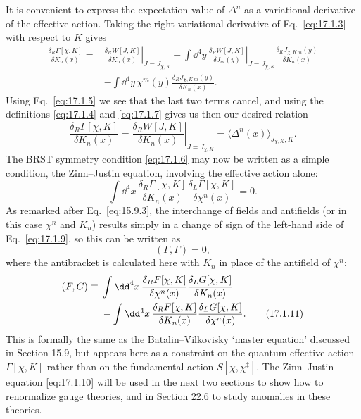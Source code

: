 It is convenient to express the expectation value of $\Delta^n$ as a variational derivative of the effective action. Taking the right variational derivative of Eq.~\eqref{eq:17.1.3} with respect to $K$ gives
\begin{align*}
\frac{\delta_R\Gamma[\chi,K]}{\delta K_n(x)}
={}&\left.\frac{\delta_R W[J,K]}{\delta K_n(x)}\right|_{J=J_{\chi,K}}
+\int \dd^4y\,
\left.\frac{\delta_R W[J,K]}{\delta J_m(y)}\right|_{J=J_{\chi,K}}
\frac{\delta_R J_{\chi,K\,m}(y)}{\delta K_n(x)}
\\
&-\int \dd^4y\,\chi^m(y)
\frac{\delta_R J_{\chi,K\,m}(y)}{\delta K_n(x)}.
\end{align*}
Using Eq.~\eqref{eq:17.1.5} we see that the last two terms cancel, and using the definitions \eqref{eq:17.1.4} and \eqref{eq:17.1.7} gives us then our desired relation
\begin{equation}
\frac{\delta_R\Gamma[\chi,K]}{\delta K_n(x)}
=\left.\frac{\delta_R W[J,K]}{\delta K_n(x)}\right|_{J=J_{\chi,K}}
=\langle\Delta^n(x)\rangle_{J_{\chi,K},K}.
\tag{17.1.8}\label{eq:17.1.8}
\end{equation}
The BRST symmetry condition \eqref{eq:17.1.6} may now be written as a simple condition, the Zinn--Justin equation, involving the effective action alone:
\begin{equation}
\int \dd^4x\,
\frac{\delta_R\Gamma[\chi,K]}{\delta K_n(x)}
\frac{\delta_L\Gamma[\chi,K]}{\delta\chi^n(x)}=0.
\tag{17.1.9}\label{eq:17.1.9}
\end{equation}
As remarked after Eq.~\eqref{eq:15.9.3}, the interchange of fields and antifields (or in this case $\chi^n$ and $K_n$) results simply in a change of sign of the left-hand side of Eq.~\eqref{eq:17.1.9}, so this can be written as
\begin{equation}
(\Gamma,\Gamma)=0,
\tag{17.1.10}\label{eq:17.1.10}
\end{equation}
where the antibracket is calculated here with $K_n$ in place of the antifield of $\chi^n$:
\begin{align}
(F,G)\equiv{}&\int \dd^4x\,
\frac{\delta_R F[\chi,K]}{\delta\chi^n(x)}
\frac{\delta_L G[\chi,K]}{\delta K_n(x)}
\notag\\
&-\int \dd^4x\,
\frac{\delta_R F[\chi,K]}{\delta K_n(x)}
\frac{\delta_L G[\chi,K]}{\delta\chi^n(x)}.
\tag{17.1.11}\label{eq:17.1.11}
\end{align}
This is formally the same as the Batalin--Vilkovisky `master equation' discussed in Section 15.9, but appears here as a constraint on the quantum effective action $\Gamma[\chi,K]$ rather than on the fundamental action $S[\chi,\chi^{\ddagger}]$. The Zinn--Justin equation \eqref{eq:17.1.10} will be used in the next two sections to show how to renormalize gauge theories, and in Section 22.6 to study anomalies in these theories.
